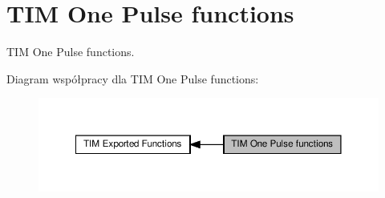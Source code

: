 \hypertarget{group___t_i_m___exported___functions___group5}{}\section{T\+IM One Pulse functions}
\label{group___t_i_m___exported___functions___group5}


T\+IM One Pulse functions.  


Diagram współpracy dla T\+IM One Pulse functions\+:\nopagebreak
\begin{figure}[H]
\begin{center}
\leavevmode
\includegraphics[width=350pt]{group___t_i_m___exported___functions___group5}
\end{center}
\end{figure}
